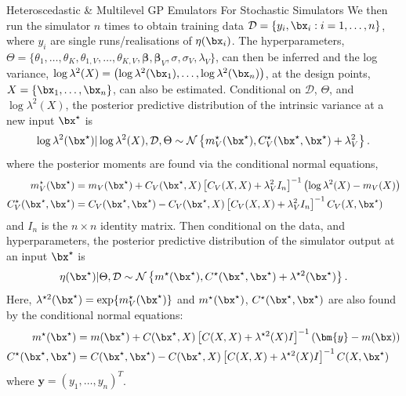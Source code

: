 \begin{chapter}{Heteroscedastic \& Multilevel GP Emulators For Stochastic Simulators\label{Ch:Hetsml}}
We then run the simulator $n$ times to obtain training data $\mathcal{D} = \{y_i, \bx_i : i = 1, \ldots, n\} $, where $y_i$ are single runs/realisations of $\eta(\bx_i)$. The hyperparameters, \newline $\Theta = \{\theta_1, \ldots, \theta_K, \theta_{1,V}, \ldots, \theta_{K,V}, \bm{\beta}, \bm{\beta}_V, \sigma, \sigma_V, \lambda_{V} \}$, can then be inferred and the log variance, $\log \lambda^2(X) = \left( \log \lambda^2(\bx_1), \ldots, \log \lambda^2(\bx_n) \right)$, at the design points, $X = \{\bx_1, \ldots, \bx_n \}$, can also be estimated. Conditional on $\mathcal{D}$, $\Theta$, and $\log \lambda^2(X)$, the posterior predictive distribution of the intrinsic variance at a new input $\bx^\star$ is
\begin{equation}
\log \lambda^2(\bx^\star) | \log \lambda^2(X), \mathcal{D}, \Theta \sim \mathcal{N} \left\{ m_V^\star(\bx^\star), C_V^\star(\bx^\star, \bx^\star) + \lambda_{V}^2 \right\}. \nonumber
\end{equation}
where the posterior moments are found via the conditional normal equations,
\begin{align}
m^\star_V(\bx^\star) & = m_V(\bx^\star) + C_V(\bx^\star, X)
\left[C_V(X, X) + \lambda_{V}^2 I_n \right]^{-1}\left(\log \lambda^2(X) -  m_V(X) \right) \nonumber\\
C_V^\star(\bx^\star, \bx^\star) & = C_V(\bx^\star, \bx^\star) - C_V(\bx^\star, X) \left[C_V(X, X) + \lambda_{V}^2 I_n \right]^{-1}C_V(X, \bx^\star)\nonumber
\end{align}
and $I_n$ is the $n \times n$ identity matrix.
Then conditional on the data, and hyperparameters, the posterior predictive distribution of the simulator output at an input $\bx^{\star}$ is
\begin{equation}
\eta(\bx^\star) | \Theta, \mathcal{D} \sim \mathcal{N} \left\{ m^\star(\bx^\star) , C^\star (\bx^\star, \bx^\star) + \lambda^{\star 2} (\bx^\star) \right\}.\nonumber
\end{equation}
Here, $\lambda^{\star 2} (\bx^\star) = \exp\{ m_V ^\star (\bx^\star) \}$ and $m^\star(\bx^\star)$, $C^\star (\bx^\star, \bx^\star)$ are also found by the conditional normal equations:
\begin{align}
m^\star(\bx^\star) & = m(\bx^\star) + C(\bx^\star, X) \left[ C(X,X) + \lambda^{\star 2} (X) I\right]^{-1}\left( \bm{y} - m(\bx) \right) \nonumber \\
C^\star(\bx^\star, \bx^\star) & = C(\bx^\star, \bx^\star) -  C(\bx^\star, X) \left[ C(X,X) + \lambda^{\star 2} (X) I \right] ^{-1} C(X, \bx^\star) \nonumber
\end{align}
where $\bm{y} = (y_1, \ldots, y_n)^T$.


\end{chapter}
